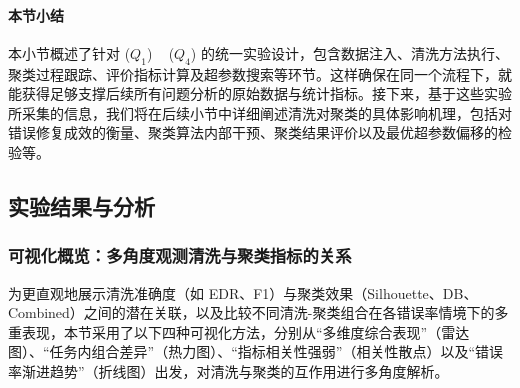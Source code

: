 \documentclass[10pt]{article} %
\numberwithin{equation}{section}
\begin{document}
\paragraph{本节小结}
本小节概述了针对 (\(Q_1\)) ~ (\(Q_4\)) 的统一实验设计，包含数据注入、清洗方法执行、聚类过程跟踪、评价指标计算及超参数搜索等环节。这样确保在同一个流程下，就能获得足够支撑后续所有问题分析的原始数据与统计指标。接下来，基于这些实验所采集的信息，我们将在后续小节中详细阐述清洗对聚类的具体影响机理，包括对错误修复成效的衡量、聚类算法内部干预、聚类结果评价以及最优超参数偏移的检验等。

\subsection{实验结果与分析}
\label{sec:exp_results}

\subsubsection{可视化概览：多角度观测清洗与聚类指标的关系}
\label{subsec:viz_overview}

为更直观地展示清洗准确度（如 EDR、F1）与聚类效果（Silhouette、DB、Combined）之间的潜在关联，以及比较不同清洗-聚类组合在各错误率情境下的多重表现，本节采用了以下四种可视化方法，分别从“多维度综合表现”（雷达图）、“任务内组合差异”（热力图）、“指标相关性强弱”（相关性散点）以及“错误率渐进趋势”（折线图）出发，对清洗与聚类的互作用进行多角度解析。
\end{document}
